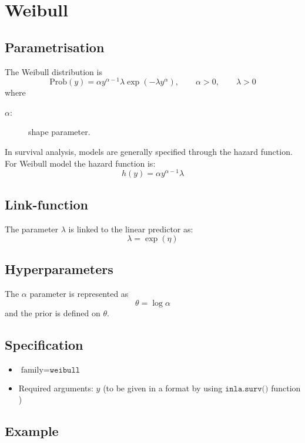 \documentclass[a4paper,11pt]{article}
\begin{document}
\section*{Weibull}

\subsection*{Parametrisation}

The Weibull distribution is
\begin{displaymath}
    \text{Prob}(y) = \alpha y^{\alpha-1} \lambda\exp( - \lambda  y^{\alpha}), \qquad \alpha>0, \qquad \lambda>0
\end{displaymath}
 where
\begin{description}
\item[$\alpha$:] shape parameter.
\end{description}
In survival analysis, models are generally specified through the hazard function. For Weibull  model the hazard function is:
\begin{displaymath}
h(y)  = \alpha y^{\alpha-1} \lambda
\end{displaymath}

\subsection*{Link-function}

The parameter $\lambda$ is linked to the linear predictor as:
\[
\lambda = \exp(\eta)
\]
\subsection*{Hyperparameters}

The $\alpha$ parameter is represented as 
\[
\theta = \log\alpha
\]
and the prior is defined on $\theta$.

\subsection*{Specification}

\begin{itemize}
\item $\text{family}=\texttt{weibull}$
\item Required arguments: $y$ (to be given in a format by using $\texttt{inla.surv()}$ function )
\end{itemize}

\subsection*{Example}
\end{document}
